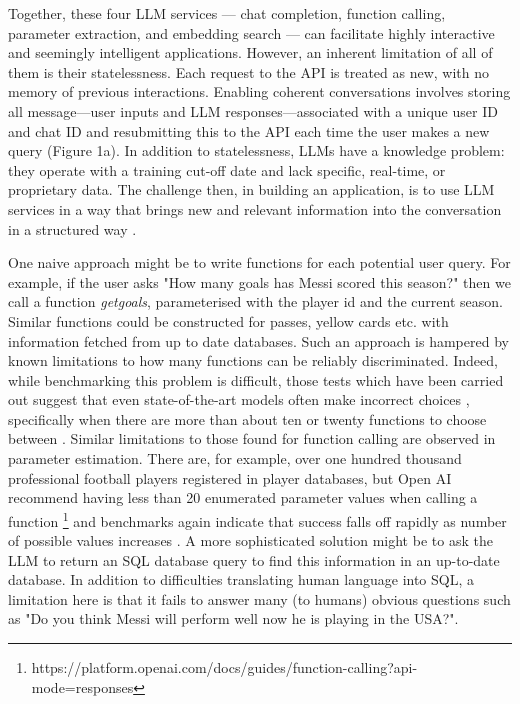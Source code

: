 \documentclass{article}
\begin{document}
Together, these four LLM services --- chat completion, function calling, parameter extraction, and embedding search --- can facilitate highly interactive and seemingly intelligent applications. However, an inherent limitation of all of them is their statelessness. Each request to the API is treated as new, with no memory of previous interactions. Enabling coherent conversations involves storing all message—user inputs and LLM responses—associated with a unique user ID and chat ID and resubmitting this to the API each time the user makes a new query (Figure 1a). In addition to statelessness, LLMs have a knowledge problem: they operate with a training cut-off date and lack specific, real-time, or proprietary data. The challenge then, in building an application, is to use LLM services in a way that brings new and relevant information into the conversation in a structured way \cite{wang2024knowledge}.

One naive approach might be to write functions for each potential user query. For example, if the user asks "How many goals has Messi scored this season?" then we call a function {\it getgoals}, parameterised with the player id and the current season. Similar functions could be constructed for passes, yellow cards etc. with information fetched from up to date databases. Such an approach is hampered by known limitations to how many functions can be reliably discriminated. Indeed, while benchmarking this problem is difficult, those tests which have been carried out suggest that even state-of-the-art models often make incorrect choices \cite{patilberkeley}, specifically when there are more than about ten or twenty functions to choose between \cite{song2025callnavi}.  Similar limitations to those found for function calling are observed in parameter estimation. There are, for example, over one hundred thousand professional football players registered in player databases, but Open AI recommend having less than 20 enumerated parameter values when calling a function \footnote{https://platform.openai.com/docs/guides/function-calling?api-mode=responses} and benchmarks again indicate that success falls off rapidly as number of possible values increases \cite{huang2024metatoolbenchmarklargelanguage}. A more sophisticated solution might be to ask the LLM to return an SQL database query to find this information in an up-to-date database. In addition to difficulties translating human language into SQL, a limitation here is that it fails to answer many (to humans) obvious questions such as "Do you think Messi will perform well now he is playing in the USA?".
\end{document}

